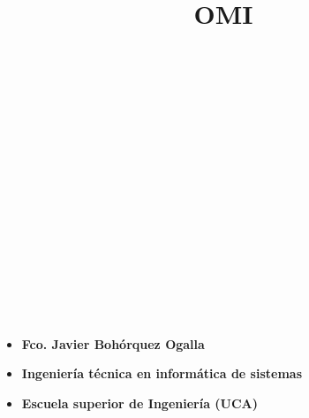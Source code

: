 \documentclass[spanish]{beamer}
\begin{document}
\title{OMI}

\begin{frame}
\hfill \\
\hfill \\
\hfill \\
\hfill \\
\hfill \\
\hfill \\
\hfill \\
\hfill \\
\hfill \\
\hfill \\
\hfill \\
\hfill \\
\hfill \\
\hfill \\
\begin{itemize}
        \item \textbf{Fco. Javier Bohórquez Ogalla}
        \item \textbf{Ingeniería técnica en informática de sistemas}
        \item \textbf{Escuela superior de Ingeniería (UCA)}
    \end{itemize}
\end{frame}


\end{document}
